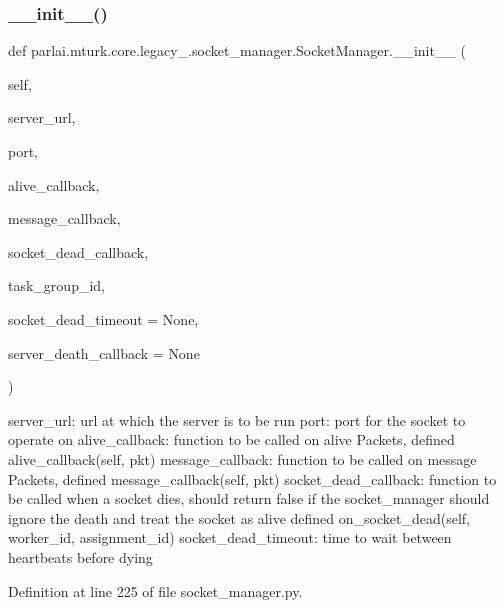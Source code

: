 \subsubsection{\texorpdfstring{\+\_\+\+\_\+init\+\_\+\+\_\+()}{\_\_init\_\_()}}
{\footnotesize\ttfamily def parlai.\+mturk.\+core.\+legacy\+\_.\+socket\+\_\+manager.\+Socket\+Manager.\+\_\+\+\_\+init\+\_\+\+\_\+ (\begin{DoxyParamCaption}\item[{}]{self,  }\item[{}]{server\+\_\+url,  }\item[{}]{port,  }\item[{}]{alive\+\_\+callback,  }\item[{}]{message\+\_\+callback,  }\item[{}]{socket\+\_\+dead\+\_\+callback,  }\item[{}]{task\+\_\+group\+\_\+id,  }\item[{}]{socket\+\_\+dead\+\_\+timeout = {\ttfamily None},  }\item[{}]{server\+\_\+death\+\_\+callback = {\ttfamily None} }\end{DoxyParamCaption})}

\begin{DoxyVerb}server_url:           url at which the server is to be run
port:                 port for the socket to operate on
alive_callback:       function to be called on alive Packets, defined
               alive_callback(self, pkt)
message_callback:     function to be called on message Packets, defined
               message_callback(self, pkt)
socket_dead_callback: function to be called when a socket dies, should
              return false if the socket_manager should ignore
              the death and treat the socket as alive defined
               on_socket_dead(self, worker_id, assignment_id)
socket_dead_timeout:  time to wait between heartbeats before dying
\end{DoxyVerb}
 

Definition at line 225 of file socket\+\_\+manager.\+py.


